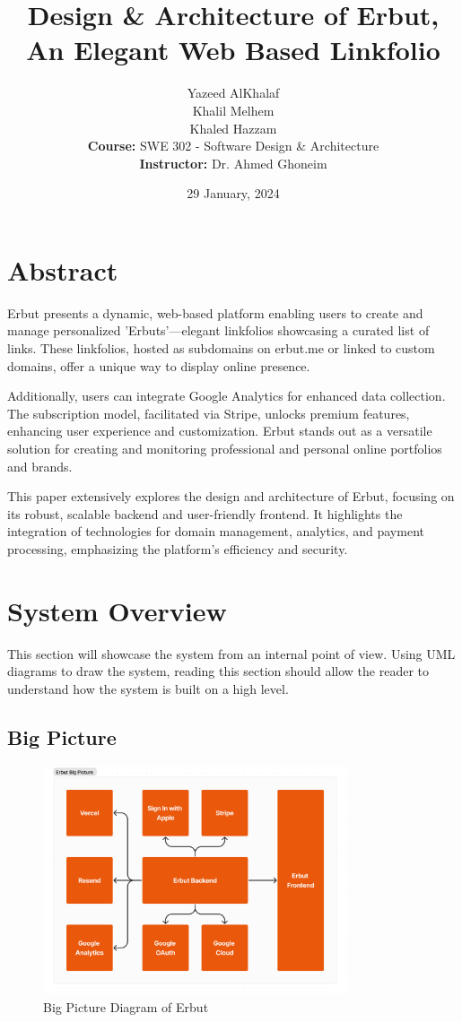 \documentclass{article}
\title{Design \& Architecture of Erbut, An Elegant Web Based Linkfolio}
\author{
    Yazeed AlKhalaf \\
    Khalil Melhem \\
    Khaled Hazzam \\
    \textbf{Course:} SWE 302 - Software Design \& Architecture \\
    \textbf{Instructor:} Dr. Ahmed Ghoneim
}
\date{29 January, 2024}
\begin{document}
\maketitle

\newpage

\section*{Abstract}

Erbut presents a dynamic, web-based platform enabling users to create and manage personalized 'Erbuts'—elegant linkfolios showcasing a curated list of links. These linkfolios, hosted as subdomains on erbut.me or linked to custom domains, offer a unique way to display online presence.

Additionally, users can integrate Google Analytics for enhanced data collection. The subscription model, facilitated via Stripe, unlocks premium features, enhancing user experience and customization. Erbut stands out as a versatile solution for creating and monitoring professional and personal online portfolios and brands.

This paper extensively explores the design and architecture of Erbut, focusing on its robust, scalable backend and user-friendly frontend. It highlights the integration of technologies for domain management, analytics, and payment processing, emphasizing the platform's efficiency and security.

\newpage

\section{System Overview}

This section will showcase the system from an internal point of view. Using UML diagrams to draw the system, reading this section should allow the reader to understand how the system is built on a high level.

\subsection{Big Picture}

\begin{figure}[h!]
\centering
\includegraphics[width=0.8\textwidth]{images/erbut-big-picture.png}
\caption{Big Picture Diagram of Erbut}
\label{fig:bigpicture}
\end{figure}
\end{document}

